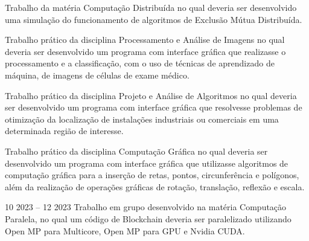\documentclass[10pt,a4paper,ragged2e,withhyper]{altacv}
\begin{document}
\begin{paracol}{2}
            Trabalho da matéria Computação Distribuída no qual deveria ser desenvolvido uma simulação do funcionamento de algoritmos de Exclusão Mútua Distribuída.\\
            \divider

            Trabalho prático da disciplina Processamento e Análise de Imagens no qual deveria ser desenvolvido um programa com interface gráfica que realizasse o processamento e a classificação, com o uso de técnicas de aprendizado de máquina, de imagens de células de exame médico.\\
            \divider
            
            Trabalho prático da disciplina Projeto e Análise de Algoritmos no qual deveria ser desenvolvido um programa com interface gráfica que resolvesse problemas de otimização da localização de instalações industriais ou comerciais em uma determinada região de interesse.\\
            \divider

            Trabalho prático da disciplina Computação Gráfica no qual deveria ser desenvolvido um programa com interface gráfica que utilizasse algoritmos de computação gráfica para a inserção de retas, pontos, circunferência e polígonos, além da realização de operações gráficas de rotação, translação, reflexão e escala.\\
            \divider

            {
            }{10 2023 -- 12 2023}{}
            Trabalho em grupo desenvolvido na matéria Computação Paralela, no qual um código de Blockchain deveria ser paralelizado utilizando Open MP para Multicore, Open MP para GPU e Nvidia CUDA.\\
            \divider


\end{paracol}
\end{document}
